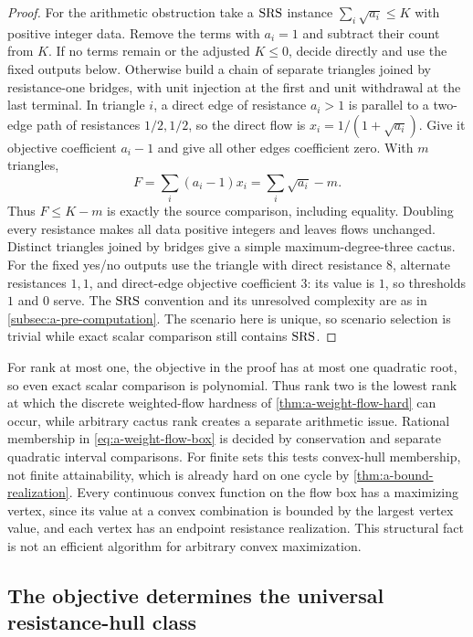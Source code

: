\begin{proof}
For the arithmetic obstruction take a $\mathrm{SRS}$ instance
$\sum_i\sqrt{a_i}\le K$ with positive integer data. Remove the terms with
$a_i=1$ and subtract their count from $K$. If no terms remain or the
adjusted $K\le0$, decide directly and use the fixed outputs below.
Otherwise build a chain of separate triangles joined by resistance-one
bridges, with unit injection at the first and unit withdrawal at the last
terminal. In triangle $i$, a direct edge of resistance $a_i>1$ is
parallel to a two-edge path of resistances $1/2,1/2$, so the direct flow
is $x_i=1/(1+\sqrt{a_i})$. Give it objective coefficient $a_i-1$ and give
all other edges coefficient zero. With $m$ triangles,
\[
 F=\sum_i(a_i-1)x_i=\sum_i\sqrt{a_i}-m.
\]
Thus $F\le K-m$ is exactly the source comparison, including equality.
Doubling every resistance makes all data positive integers and leaves
flows unchanged. Distinct triangles joined by bridges give a simple
maximum-degree-three cactus. For the fixed yes/no outputs use the
triangle with direct resistance $8$, alternate resistances $1,1$, and
direct-edge objective coefficient $3$: its value is $1$, so thresholds
$1$ and $0$ serve. The $\mathrm{SRS}$ convention and its unresolved complexity
are as in \cref{subsec:a-pre-computation}. The scenario here is unique,
so scenario selection is trivial while exact scalar comparison still
contains $\mathrm{SRS}$.
\end{proof}

For rank at most one, the objective in the proof has at most one quadratic
root, so even exact scalar comparison is polynomial. Thus rank two is
the lowest rank at which the discrete weighted-flow hardness of
\cref{thm:a-weight-flow-hard} can occur, while arbitrary cactus rank
creates a separate arithmetic issue. Rational membership in
\cref{eq:a-weight-flow-box} is decided by conservation and separate
quadratic interval comparisons. For finite sets this tests convex-hull
membership, not finite attainability, which is already hard on one cycle
by \cref{thm:a-bound-realization}. Every continuous convex function on
the flow box has a maximizing vertex, since its value at a convex
combination is bounded by the largest vertex value, and each vertex has
an endpoint resistance realization. This structural fact is not an
efficient algorithm for arbitrary convex maximization.

\subsection{The objective determines the universal resistance-hull class}

